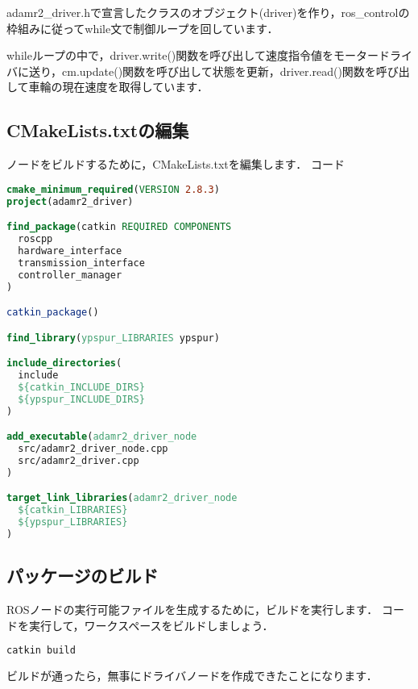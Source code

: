 \documentclass[{../../master}]{subfiles}
\begin{document}
\textsf{adamr2\_driver.h}で宣言したクラスのオブジェクト(\textsf{driver})を作り，\textsf{ros\_control}の枠組みに従って\textsf{while}文で制御ループを回しています．

\textsf{while}ループの中で，\textsf{driver.write()}関数を呼び出して速度指令値をモータードライバに送り，\textsf{cm.update()}関数を呼び出して状態を更新，\textsf{driver.read()}関数を呼び出して車輪の現在速度を取得しています．

\subsection{\textsf{CMakeLists.txt}の編集}

ノードをビルドするために，\textsf{CMakeLists.txt}を編集します．
コード

\begin{lstlisting}[language=cmake, label=code:adamr2_driver_cmakelists, caption=\textsf{CMakeLists.txt}]
cmake_minimum_required(VERSION 2.8.3)
project(adamr2_driver)

find_package(catkin REQUIRED COMPONENTS
  roscpp
  hardware_interface
  transmission_interface
  controller_manager
)

catkin_package()

find_library(ypspur_LIBRARIES ypspur)

include_directories(
  include
  ${catkin_INCLUDE_DIRS}
  ${ypspur_INCLUDE_DIRS}
)

add_executable(adamr2_driver_node
  src/adamr2_driver_node.cpp
  src/adamr2_driver.cpp
)

target_link_libraries(adamr2_driver_node
  ${catkin_LIBRARIES}
  ${ypspur_LIBRARIES}
)
\end{lstlisting}

\subsection{パッケージのビルド}

ROSノードの実行可能ファイルを生成するために，ビルドを実行します．
コードを実行して，ワークスペースをビルドしましょう．

\begin{lstlisting}[language=sh, label=code:build_adamr2_driver, caption=Build Workspace]
catkin build
\end{lstlisting}

ビルドが通ったら，無事にドライバノードを作成できたことになります．
\end{document}
